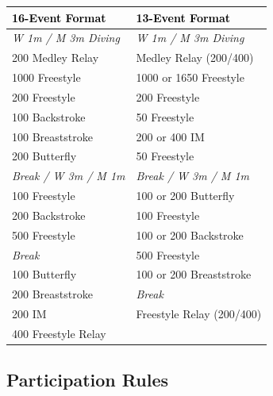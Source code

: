 \begin{table}[H]
\centering
\renewcommand{\arraystretch}{1.2}
\begin{tabular}{p{7cm} p{7cm}}
\toprule
\rowcolor{teamprimary!25}
\textbf{\textcolor{black}{16-Event Format}} & \textbf{\textcolor{black}{13-Event Format}} \\
\midrule
\rowcolor{teamsecondary!12}
\textit{W 1m / M 3m Diving} & \textit{W 1m / M 3m Diving} \\
\rowcolor{teamprimary!8}
200 Medley Relay & Medley Relay (200/400) \\
\rowcolor{teamsecondary!12}
1000 Freestyle & 1000 or 1650 Freestyle \\
\rowcolor{teamprimary!8}
200 Freestyle & 200 Freestyle \\
\rowcolor{teamsecondary!12}
100 Backstroke & 50 Freestyle \\
\rowcolor{teamprimary!8}
100 Breaststroke & 200 or 400 IM \\
\rowcolor{teamsecondary!12}
200 Butterfly & 50 Freestyle \\
\rowcolor{teamprimary!8}
\textit{Break / W 3m / M 1m} & \textit{Break / W 3m / M 1m} \\
\rowcolor{teamsecondary!12}
100 Freestyle & 100 or 200 Butterfly \\
\rowcolor{teamprimary!8}
200 Backstroke & 100 Freestyle \\
\rowcolor{teamsecondary!12}
500 Freestyle & 100 or 200 Backstroke \\
\rowcolor{teamprimary!8}
\textit{Break} & 500 Freestyle \\
\rowcolor{teamsecondary!12}
100 Butterfly & 100 or 200 Breaststroke \\
\rowcolor{teamprimary!8}
200 Breaststroke & \textit{Break} \\
\rowcolor{teamsecondary!12}
200 IM & Freestyle Relay (200/400) \\
\rowcolor{teamprimary!8}
400 Freestyle Relay &  \\
\bottomrule
\end{tabular}
\end{table}


\subsection*{Participation Rules}

